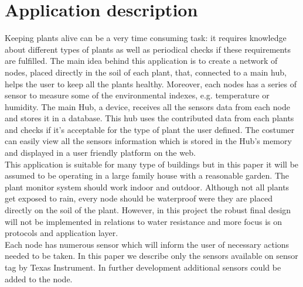 \section{Application description}
Keeping plants alive can be a very time consuming task: it requires knowledge about different types of plants as well as periodical checks if these requirements are fulfilled. 
The main idea behind this application is to create a network of nodes, placed directly in the soil of each plant, that, connected to a main hub, helps the user to keep all the plants healthy. Moreover, each nodes has a series of sensor to measure some of the environmental indexes, e.g. temperature or humidity. The main Hub, a device, receives all the sensors data from each node and stores it in a database. This hub uses the contributed data from each plants and checks if it's acceptable for the type of plant the user defined. The costumer can easily view all the sensors information which is stored in the Hub's memory and displayed in a user friendly platform on the web.	\\
This application is suitable for many type of buildings but in this paper it will be assumed to be operating in a large family house with a reasonable garden. The plant monitor system should work indoor and outdoor. Although not all plants get exposed to rain, every node should be waterproof were they are placed directly on the soil of the plant. However, in this project the robust final design will not be implemented in relations to water resistance and more focus is on protocols and application layer.\\
Each node has numerous sensor which will inform the user of necessary actions needed to be taken. In this paper we describe only the sensors available on sensor tag by Texas Instrument. In further development additional sensors could be added to the node.
 \\
